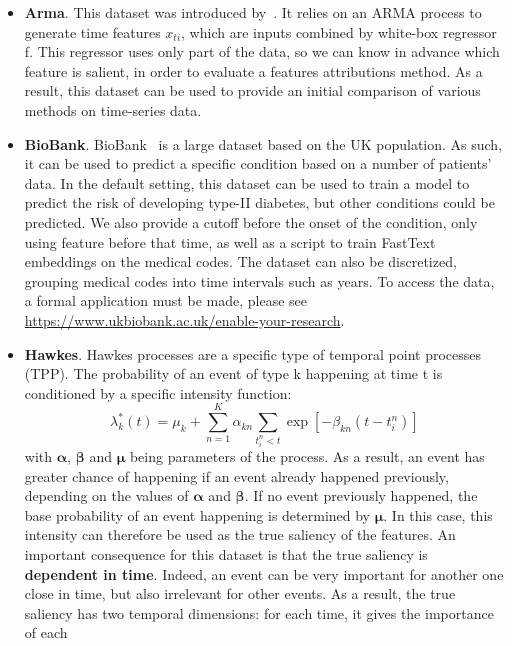\begin{itemize}
    \item \textbf{Arma}.
        This dataset was introduced by~\citep{crabbe2021explaining}.
        It relies on an ARMA process to generate time features $x_{ti}$, which are inputs combined by white-box
        regressor f.
        This regressor uses only part of the data, so we can know in advance which feature is salient, in order to
        evaluate a features attributions method.
        As a result, this dataset can be used to provide an initial comparison of various methods on time-series data.
    \item \textbf{BioBank}.
        BioBank~\citep{sudlow2015uk} is a large dataset based on the UK population.
        As such, it can be used to predict a specific condition based on a number of patients' data.
        In the default setting, this dataset can be used to train a model to predict the risk of developing type-II
        diabetes, but other conditions could be predicted.
        We also provide a cutoff before the onset of the condition, only using feature before that time, as well as
        a script to train FastText~\citep{bojanowski2017enriching} embeddings on the medical codes.
        The dataset can also be discretized, grouping medical codes into time intervals such as years.
        To access the data, a formal application must be made, please see
        \url{https://www.ukbiobank.ac.uk/enable-your-research}.
    \item \textbf{Hawkes}.
        Hawkes processes are a specific type of temporal point processes (TPP).
        The probability of an event of type k happening at time t is conditioned by a specific intensity function:
        \[ \lambda^*_k(t) = \mu_k + \sum_{n=1}^K \alpha_{kn} \sum_{t_i^n < t} \exp \left[ -\beta_{kn} (t - t_i^n) \right] \]
        with $\bm{\alpha}$, $\bm{\beta}$ and $\bm{\mu}$ being parameters of the process.
        As a result, an event has greater chance of happening if an event already happened previously, depending on the
        values of $\bm{\alpha}$ and $\bm{\beta}$.
        If no event previously happened, the base probability of an event happening is determined by $\bm{\mu}$.
        In this case, this intensity can therefore be used as the true saliency of the features.
        An important consequence for this dataset is that the true saliency is \textbf{dependent in time}.
        Indeed, an event can be very important for another one close in time, but also irrelevant for other events.
        As a result, the true saliency has two temporal dimensions: for each time, it gives the importance of each

\end{itemize}
